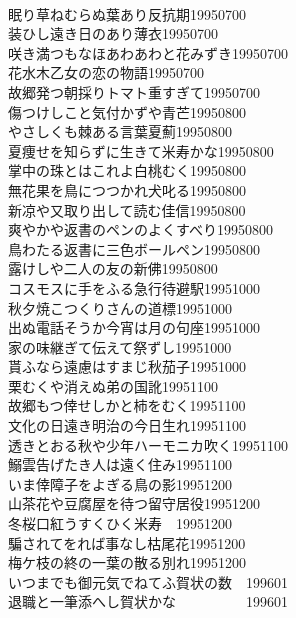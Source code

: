 \begin{multicols}{2}
\\眠り草ねむらぬ葉あり反抗期\hfill{19950700}
\\装ひし遠き日のあり薄衣\hfill{19950700}
\\咲き満つもなほあわあわと花みずき\hfill{19950700}
\\花水木乙女の恋の物語\hfill{19950700}
\\故郷発つ朝採りトマト重すぎて\hfill{19950700}
\\傷つけしこと気付かずや青芒\hfill{19950800}
\\やさしくも棘ある言葉夏薊\hfill{19950800}
\\夏痩せを知らずに生きて米寿かな\hfill{19950800}
\\掌中の珠とはこれよ白桃むく\hfill{19950800}
\\無花果を鳥につつかれ犬叱る\hfill{19950800}
\\新凉や又取り出して読む佳信\hfill{19950800}
\\爽やかや返書のペンのよくすべり\hfill{19950800}
\\鳥わたる返書に三色ボールペン\hfill{19950800}
\\露けしや二人の友の新佛\hfill{19950800}
\\コスモスに手をふる急行待避駅\hfill{19951000}
\\秋夕焼こつくりさんの道標\hfill{19951000}
\\出ぬ電話そうか今宵は月の句座\hfill{19951000}
\\家の味継ぎて伝えて祭ずし\hfill{19951000}
\\貰ふなら遠慮はすまじ秋茄子\hfill{19951000}
\\栗むくや消えぬ弟の国訛\hfill{19951100}
\\故郷もつ倖せしかと柿をむく\hfill{19951100}
\\文化の日遠き明治の今日生れ\hfill{19951100}
\\透きとおる秋や少年ハーモニカ吹く\hfill{19951100}
\\鰯雲告げたき人は遠く住み\hfill{19951100}
\\いま倖障子をよぎる鳥の影\hfill{19951200}
\\山茶花や豆腐屋を待つ留守居役\hfill{19951200}
\\冬桜口紅うすくひく米寿　\hfill{19951200}
\\騙されてをれば事なし枯尾花\hfill{19951200}
\\梅ケ枝の終の一葉の散る別れ\hfill{19951200}
\\いつまでも御元気でねてふ賀状の数　\hfill{199601}
\\退職と一筆添へし賀状かな　　　　　\hfill{199601}

\end{multicols}
